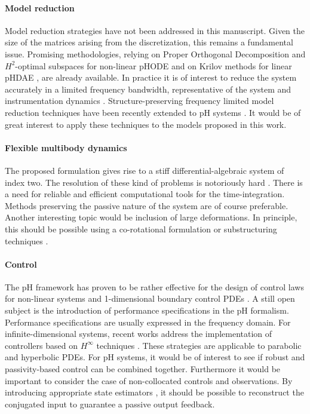 \paragraph{Model reduction}
Model reduction strategies have not been addressed in this manuscript. Given the size of the matrices arising from the discretization, this remains a fundamental issue. Promising methodologies, relying on Proper Orthogonal Decomposition and $H^2$-optimal subspaces for non-linear pHODE \cite{chaturantabut2016} and on Krilov methods for linear pHDAE \cite{egger2018}, are already available.  In practice it is of interest to reduce the system accurately in a limited frequency bandwidth, representative of the system and instrumentation dynamics \cite{vuillemin2014frequency}. Structure-preserving frequency limited model reduction techniques have been recently extended to pH systems \cite{xu2020sp}. It would be of great interest to apply these techniques to the models proposed in this work.

\paragraph{Flexible multibody dynamics}
The proposed formulation gives rise to a stiff differential-algebraic system of index two. The resolution of these kind of problems is notoriously hard \cite{brenan1995dae}. There is a need for reliable and efficient computational tools for the time-integration. Methods preserving the passive nature of the system are of course preferable. \\ Another interesting topic would be inclusion of large deformations. In principle, this should be possible using a co-rotational formulation or substructuring techniques \cite{wu1988substructuring}.

\paragraph{Control}
The pH framework has proven to be rather effective for the design of control laws for non-linear systems \cite{ortega2004survey} and 1-dimensional boundary control PDEs \cite{macchelli2020exponential}. A still open subject is the introduction of performance specifications in the pH formalism. Performance specifications are usually expressed in the frequency domain. For infinite-dimensional systems, recent works address the implementation of controllers based on $H^\infty$ techniques \cite{apkarian2018structured,apkarian2020bd}. These strategies are applicable to parabolic and hyperbolic PDEs. For pH systems, it would be of interest to see if robust and passivity-based control can be combined together.  Furthermore it would be important to consider the case of non-collocated controls and observations. By introducing appropriate state estimators \cite{yaghmaei2019}, it should be possible to reconstruct the conjugated input to guarantee a passive output feedback.


